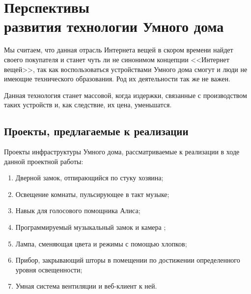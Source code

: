 \documentclass[a4paper,14pt]{extarticle}
\begin{document}
\fi
\section{Перспективы\\развития технологии Умного дома}
Мы считаем, что данная отрасль Интернета вещей в скором времени найдет своего покупателя и станет чуть ли не синонимом концепции <<Интернет вещей>>, так как воспользоваться устройствами Умного дома смогут и люди не имеющие технического образования. Род их деятельности так же не важен.

Данная технология станет массовой, когда издержки, связанные с производством таких устройств и, как следствие, их цена, уменьшатся.
\subsection*{Проекты, предлагаемые к реализации}
Проекты инфраструктуры Умного дома, рассматриваемые к реализации в ходе данной проектной работы:
\begin{enumerate}
	\item Дверной замок, отпирающийся по стуку хозяина;
	\item Освещение комнаты, пульсирующее в такт музыке;
	\item Навык для голосового помощника Алиса;
	\item Программируемый музыкальный замок и камера ;
	\item Лампа, сменяющая цвета и режимы с помощью хлопков;
	\item Прибор, закрывающий шторы в помещении по достижении определенного уровня освещенности;
	\item Умная система вентиляции и веб-клиент к ней.
\end{enumerate}
\end{document}
